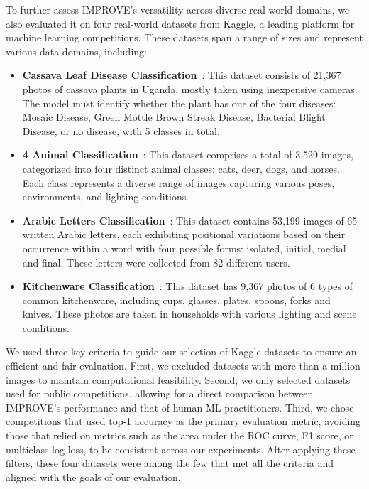 To further assess IMPROVE’s versatility across diverse real-world domains, we also evaluated it on four real-world datasets from Kaggle, a leading platform for machine learning competitions. These datasets span a range of sizes and represent various data domains, including:
\begin{itemize}
    \item \textbf{Cassava Leaf Disease Classification}~\citep{2020cassava}: This dataset consists of 21,367 photos of cassava plants in Uganda, mostly taken using inexpensive cameras. The model must identify whether the plant has one of the four diseases: Mosaic Disease, Green Mottle Brown Streak Disease, Bacterial Blight Disease, or no disease, with 5 classes in total.
    \item \textbf{4 Animal Classification}~\citep{lee2022animal}: This dataset comprises a total of 3,529 images, categorized into four distinct animal classes: cats, deer, dogs, and horses. Each class represents a diverse range of images capturing various poses, environments, and lighting conditions.
    \item \textbf{Arabic Letters Classification}~\citep{khalil2023arabic}: This dataset contains 53,199 images of 65 written Arabic letters, each exhibiting positional variations based on their occurrence within a word with four possible forms: isolated, initial, medial and final. These letters were collected from 82 different users.
    \item \textbf{Kitchenware Classification}~\citep{ololo2022kitchenware}: This dataset has 9,367 photos of 6 types of common kitchenware, including cups, glasses, plates, spoons, forks and knives. These photos are taken in households with various lighting and scene conditions.
\end{itemize}

We used three key criteria to guide our selection of Kaggle datasets to ensure an efficient and fair evaluation. First, we excluded datasets with more than a million images to maintain computational feasibility. Second, we only selected datasets used for public competitions, allowing for a direct comparison between IMPROVE's performance and that of human ML practitioners. Third, we chose competitions that used top-1 accuracy as the primary evaluation metric, avoiding those that relied on metrics such as the area under the ROC curve, F1 score, or multiclass log loss, to be consistent across our experiments. After applying these filters, these four datasets were among the few that met all the criteria and aligned with the goals of our evaluation.

